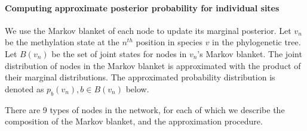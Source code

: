 \documentclass[11pt]{article}
\theoremstyle{theorem}
\theoremstyle{proposition}
\begin{document}
\paragraph{Computing approximate posterior probability for individual sites}
We use the Markov blanket of each node to update its marginal
posterior.  Let $v_{n}$ be the methylation state at the $n^{th}$
position in species $v$ in the phylogenetic tree. Let $B(v_{n})$ be
the set of joint states for nodes in $v_{n}$'s Markov blanket. The
joint distribution of nodes in the Markov blanket is approximated with
the product of their marginal distributions.  The approximated
probability distribution is denoted as $p_{b}(v_n), b\in B(v_{n})$
below.

There are 9 types of nodes in the network, for each of which we
describe the composition of the Markov blanket, and the approximation
procedure.
\end{document}
